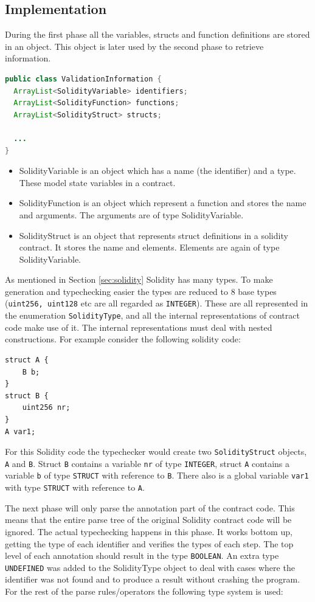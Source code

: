\documentclass[a4paper]{article}
\begin{document}
\subsection{Implementation}
During the first phase all the variables, structs and function definitions are stored in an object. This object is later used by the second phase to retrieve information.
\begin{lstlisting}[breaklines=true, language=Java ]
public class ValidationInformation {
  ArrayList<SolidityVariable> identifiers;
  ArrayList<SolidityFunction> functions;
  ArrayList<SolidityStruct> structs;

  ...
}
\end{lstlisting}
\begin{itemize}
  \item SolidityVariable is an object which has a name (the identifier) and a type. These model state variables in a contract.
  \item SolidityFunction is an object which represent a function and stores the name and arguments. The arguments are of type SolidityVariable.
  \item SolidityStruct is an object that represents struct definitions in a solidity contract. It stores the name and elements. Elements are again of type SolidityVariable.
\end{itemize}
As mentioned in Section \ref{sec:solidity} Solidity has many types. To make generation and typechecking easier the types are reduced to 8 base types (\texttt{uint256, uint128} etc are all regarded as \texttt{INTEGER}). These are all represented in the enumeration \texttt{SolidityType}, and all the internal representations of contract code make use of it. The internal representations must deal with nested constructions. For example consider the following solidity code:
\begin{lstlisting}[breaklines=true, language=Solidity ]
struct A {
    B b;
}
struct B {
    uint256 nr;
}
A var1;
\end{lstlisting}
For this Solidity code the typechecker would create two \texttt{SolidityStruct} objects, \texttt{A} and \texttt{B}. Struct \texttt{B} contains a variable \texttt{nr} of type \texttt{INTEGER}, struct \texttt{A} contains a variable \texttt{b} of type \texttt{STRUCT} with reference to \texttt{B}. There also is a global variable \texttt{var1} with type \texttt{STRUCT} with reference to \texttt{A}. \par
The next phase will only parse the annotation part of the contract code. This means that the entire parse tree of the original Solidity contract code will be ignored. The actual typechecking happens in this phase. It works bottom up, getting the type of each identifier and verifies the types of each step. The top level of each annotation should result in the type \texttt{BOOLEAN}. An extra type \texttt{UNDEFINED} was added to the SolidityType object to deal with cases where the identifier was not found and to produce a result without crashing the program. For the rest of the parse rules/operators the following type system is used:
\end{document}
